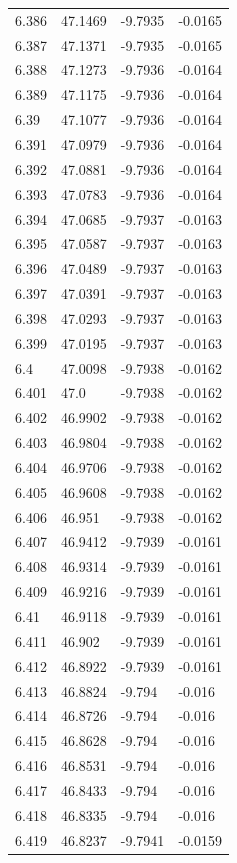 \begin{tabular}{llll}
6.386 & 47.1469 & -9.7935 & -0.0165 \\
6.387 & 47.1371 & -9.7935 & -0.0165 \\
6.388 & 47.1273 & -9.7936 & -0.0164 \\
6.389 & 47.1175 & -9.7936 & -0.0164 \\
6.39 & 47.1077 & -9.7936 & -0.0164 \\
6.391 & 47.0979 & -9.7936 & -0.0164 \\
6.392 & 47.0881 & -9.7936 & -0.0164 \\
6.393 & 47.0783 & -9.7936 & -0.0164 \\
6.394 & 47.0685 & -9.7937 & -0.0163 \\
6.395 & 47.0587 & -9.7937 & -0.0163 \\
6.396 & 47.0489 & -9.7937 & -0.0163 \\
6.397 & 47.0391 & -9.7937 & -0.0163 \\
6.398 & 47.0293 & -9.7937 & -0.0163 \\
6.399 & 47.0195 & -9.7937 & -0.0163 \\
6.4 & 47.0098 & -9.7938 & -0.0162 \\
6.401 & 47.0 & -9.7938 & -0.0162 \\
6.402 & 46.9902 & -9.7938 & -0.0162 \\
6.403 & 46.9804 & -9.7938 & -0.0162 \\
6.404 & 46.9706 & -9.7938 & -0.0162 \\
6.405 & 46.9608 & -9.7938 & -0.0162 \\
6.406 & 46.951 & -9.7938 & -0.0162 \\
6.407 & 46.9412 & -9.7939 & -0.0161 \\
6.408 & 46.9314 & -9.7939 & -0.0161 \\
6.409 & 46.9216 & -9.7939 & -0.0161 \\
6.41 & 46.9118 & -9.7939 & -0.0161 \\
6.411 & 46.902 & -9.7939 & -0.0161 \\
6.412 & 46.8922 & -9.7939 & -0.0161 \\
6.413 & 46.8824 & -9.794 & -0.016 \\
6.414 & 46.8726 & -9.794 & -0.016 \\
6.415 & 46.8628 & -9.794 & -0.016 \\
6.416 & 46.8531 & -9.794 & -0.016 \\
6.417 & 46.8433 & -9.794 & -0.016 \\
6.418 & 46.8335 & -9.794 & -0.016 \\
6.419 & 46.8237 & -9.7941 & -0.0159 \\

\end{tabular}
